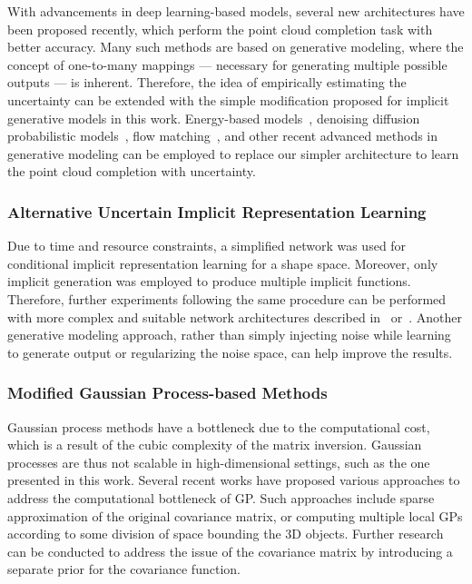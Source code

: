         With advancements in deep learning-based models, several new architectures have been proposed recently, which perform the point cloud completion task with better accuracy. Many such methods are based on generative modeling, where the concept of one-to-many mappings — necessary for generating multiple possible outputs — is inherent. Therefore, the idea of empirically estimating the uncertainty can be extended with the simple modification proposed for implicit generative models in this work. Energy-based models~\cite{EBResLT}, denoising diffusion probabilistic models~\cite{DDPM}, flow matching~\cite{PSF}, and other recent advanced methods in generative modeling can be employed to replace our simpler architecture to learn the point cloud completion with uncertainty.
    
        \subsubsection{Alternative Uncertain Implicit Representation Learning}
        Due to time and resource constraints, a simplified network was used for conditional implicit representation learning for a shape space. Moreover, only implicit generation was employed to produce multiple implicit functions. Therefore, further experiments following the same procedure can be performed with more complex and suitable network architectures described in~\cite{DiGS} or~\cite{NeuralHessian}. Another generative modeling approach, rather than simply injecting noise while learning to generate output or regularizing the noise space, can help improve the results.
    
        \subsubsection{Modified Gaussian Process-based Methods}
        Gaussian process methods have a bottleneck due to the computational cost, which is a result of the cubic complexity of the matrix inversion. Gaussian processes are thus not scalable in high-dimensional settings, such as the one presented in this work. Several recent works have proposed various approaches to address the computational bottleneck of GP. Such approaches include sparse approximation of the original covariance matrix, or computing multiple local GPs according to some division of space bounding the 3D objects. Further research can be conducted to address the issue of the covariance matrix by introducing a separate prior for the covariance function.

